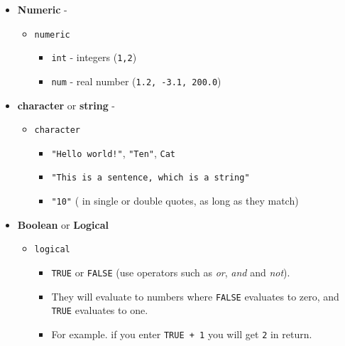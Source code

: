 \documentclass[
]{book}
\providecommand{\tightlist}{%
  \setlength{\itemsep}{0pt}\setlength{\parskip}{0pt}}
\begin{document}
\begin{itemize}
\item
  \textbf{Numeric} -

  \begin{itemize}
  \tightlist
  \item
    \texttt{numeric}

    \begin{itemize}
    \tightlist
    \item
      \texttt{int} - integers (\texttt{1,2})
    \item
      \texttt{num} - real number (\texttt{1.2,\ -3.1,\ 200.0})
    \end{itemize}
  \end{itemize}
\item
  \textbf{character} or \textbf{string} -

  \begin{itemize}
  \tightlist
  \item
    \texttt{character}

    \begin{itemize}
    \tightlist
    \item
      \texttt{"Hello\ world!"}, \texttt{"Ten"}, \texttt{\textquotesingle{}Cat\textquotesingle{}}
    \item
      \texttt{"This\ is\ a\ sentence,\ which\ is\ a\ string"}
    \item
      \texttt{"10"} ( in single or double quotes, as long as they match)
    \end{itemize}
  \end{itemize}
\item
  \textbf{Boolean} or \textbf{Logical}

  \begin{itemize}
  \tightlist
  \item
    \texttt{logical}

    \begin{itemize}
    \tightlist
    \item
      \texttt{TRUE} or \texttt{FALSE} (use operators such as \emph{or}, \emph{and} and \emph{not}).
    \item
      They will evaluate to numbers where \texttt{FALSE} evaluates to zero, and \texttt{TRUE} evaluates to one.
    \item
      For example. if you enter \texttt{TRUE\ +\ 1} you will get \texttt{2} in return.
    \end{itemize}
  \end{itemize}
\end{itemize}
\end{document}
